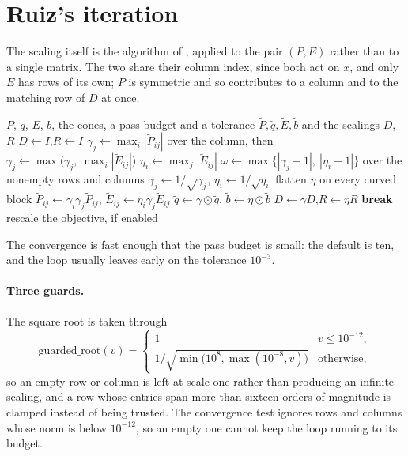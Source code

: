 \documentclass[a4paper,11pt]{book}
\theoremstyle{plain}
\theoremstyle{definition}
\theoremstyle{remark}
\numberwithin{equation}{chapter}
\numberwithin{algorithm}{chapter}
\begin{document}
	\section{Ruiz's iteration}

	The scaling itself is the algorithm of \cite{Ruiz2001}, applied to the pair
	$(P,E)$ rather than to a single matrix. The two share their column index,
	since both act on $x$, and only $E$ has rows of its own; $P$ is symmetric and
	so contributes to a column and to the matching row of $D$ at once.

	\begin{algorithm}[H]
		\caption{Ruiz equilibration of the pair $(P,E)$}
		\begin{algorithmic}[1]
			\Require $P$, $q$, $E$, $b$, the cones, a pass budget and a tolerance
			\Ensure $\widetilde P,\widetilde q,\widetilde E,\widetilde b$ and the
			scalings $D$, $R$
			\State $D\gets I$,\quad $R\gets I$
			\State $\gamma_j\gets\max_i|\widetilde P_{ij}|$ over the column, then
			$\gamma_j\gets\max\bigl(\gamma_j,\ \max_i|\widetilde E_{ij}|\bigr)$
			\State $\eta_i\gets\max_j|\widetilde E_{ij}|$
			\State $\omega\gets\max\bigl\{|\gamma_j-1|,\ |\eta_i-1|\bigr\}$ over the
			nonempty rows and columns
			\State $\gamma_j\gets1/\sqrt{\gamma_j}$,\quad
			$\eta_i\gets1/\sqrt{\eta_i}$
			\State flatten $\eta$ on every curved block
			\State $\widetilde P_{ij}\gets\gamma_i\gamma_j\widetilde P_{ij}$,\quad
			$\widetilde E_{ij}\gets\eta_i\gamma_j\widetilde E_{ij}$
			\State $\widetilde q\gets\gamma\odot\widetilde q$,\quad
			$\widetilde b\gets\eta\odot\widetilde b$
			\State $D\gets\gamma D$,\quad $R\gets\eta R$
			\State \textbf{break}
			\EndIf
			\EndFor
			\State rescale the objective, if enabled
		\end{algorithmic}
	\end{algorithm}


	The convergence is fast enough that the pass budget is small: the default is
	ten, and the loop usually leaves early on the tolerance $10^{-3}$. 
	
	\paragraph{Three guards.}
	The square root is taken through
	\[
	\text{guarded\_root}(v)=
	\begin{cases}
		1 & v\leq10^{-12},\\[1mm]
		1/\sqrt{\min\bigl(10^{8},\max(10^{-8},v)\bigr)} & \text{otherwise},
	\end{cases}
	\]
	so an empty row or column is left at scale one rather than producing an
	infinite scaling, and a row whose entries span more than sixteen orders of
	magnitude is clamped instead of being trusted. The convergence test ignores
	rows and columns whose norm is below $10^{-12}$, so an empty one cannot keep
	the loop running to its budget.
\end{document}
